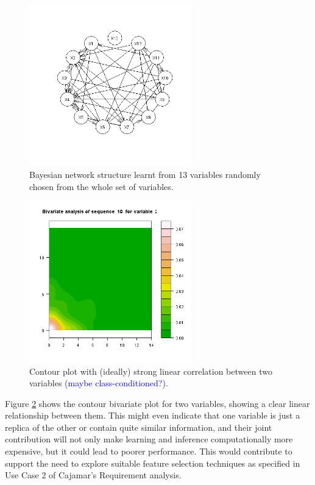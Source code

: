 \begin{figure}[htbp]
  \centering
    \includegraphics[width=70mm]{figures/CajaMarBayesianNetwork}
    \vspace{-1cm}
    \caption{Bayesian network structure learnt from 13 variables randomly chosen from the whole set of variables.}
    \label{fig:CajaMarBayesianNetwork}
\end{figure}




\begin{figure}[htbp]
  \centering
    \includegraphics[width=70mm]{figures/CajaMarbv4}
    \caption{Contour plot with (ideally) strong linear correlation between two variables \textcolor{blue}{(maybe class-conditioned?).}}
    \label{fig:CajamarContourPlot}
\end{figure}



Figure \ref{fig:CajamarContourPlot} shows the contour bivariate plot for two variables, showing a clear linear relationship between them. This might even indicate that one variable is just a replica of the other or contain quite similar information, and their joint contribution will not only make learning and inference computationally more expensive, but it could lead to poorer performance. This would contribute to support the need to explore suitable feature selection techniques as specified in Use Case 2 of Cajamar's Requirement analysis.



